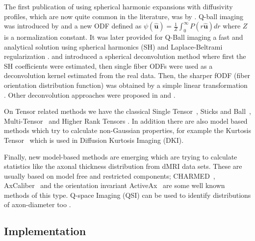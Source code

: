 \documentclass{bioinfo}
\begin{document}
\begin{methods}
%
The first publication of using spherical harmonic expansions with
diffusivity profiles, which are now quite common in the literature,
was by \citet{alexander2002detection}. Q-ball imaging
was introduced by \citet{Tuch2004} and a new ODF defined as
$\psi(\mathbf{\hat{u}})=\frac{1}{Z}\int_{0}^{\infty}P(r\mathbf{\hat{u}})dr$
where $Z$ is a normalization constant. It was later provided for
Q-Ball imaging a fast and analytical solution using spherical harmonics
(SH) and Laplace-Beltrami regularization \citep{Descoteaux2007MagResMed}. \citet{tournier2004direct} and \citet{Tournier2007} introduced
a spherical deconvolution method where first the SH coefficients were
estimated, then single fiber ODFs were used as a deconvolution kernel
estimated from the real data. Then, the sharper fODF (fiber orientation
distribution function) was obtained by a simple linear transformation
\citep{descoteaux2007deterministic}. Other deconvolution approaches
were proposed in \citet{sakaie2007objective} and \citet{yeh2011estimation}.

On Tensor related methods we have the classical Single Tensor~\citep{Basser1994BiophysicalJ},
Sticks and Ball~\citep{Behrens2007NeuroImage}, Multi-Tensor~\citep{pasternak2008variational,
liu2004characterizing} and Higher Rank Tensors \citep{ozarslan2003generalized,
barmpoutis2009regularized}. In addition there are also model
based methods which try to calculate non-Gaussian properties, for
example the Kurtosis Tensor~\citep{jensen2005diffusional, lu2006three}
which is used in Diffusion Kurtosis Imaging (DKI).

Finally, new model-based methods are emerging which are trying to
calculate statistics like the axonal thickness distribution from dMRI
data sets. These are usually based on model free and restricted components;
CHARMED~\citep{assaf2005composite, assaf2004new}, AxCaliber~\citep{assaf2008axcaliber}
and the orientation invariant ActiveAx~\citep{alexander2010orientationally}
are some well known methods of this type. Q-space Imaging (QSI) can
be used to identify distributions of axon-diameter too \cite{ong2010quantifying}.


\subsection{Implementation }


\end{methods}
\end{document}
